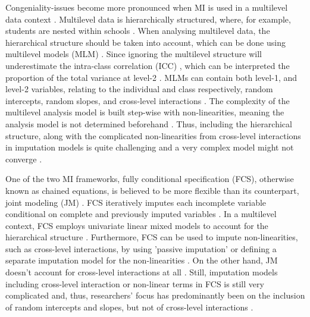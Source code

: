 \documentclass[10pt, a4paper, titlepage]{article}
\begin{document}
Congeniality-issues become more pronounced when MI is used in a multilevel data context \citep{mistlerComparisonJointModel2017, enders2018, enders2018a, enders2020, buurenFlexibleImputationMissing2018, taljaard2008, enders2016, resche-rigon2018, audigier2018, dong2023, grund2016, grund2018a, grund2018, ludtke2017, grund2021, quartagno2022}. Multilevel data is hierarchically structured, where, for example, students are nested within schools \citep{hox2017, hox2011}. When analysing multilevel data, the hierarchical structure should be taken into account, which can be done using multilevel models (MLM) \citep{hox2017, hox2011, ludtke2017}. Since ignoring the multilevel structure will underestimate the intra-class correlation (ICC) \citep{buurenFlexibleImputationMissing2018, ludtke2017, taljaard2008, hox2011}, which can be interpreted the proportion of the total variance at level-2 \citep{gulliford2005, shieh2012, hox2011}. MLMs can contain both level-1, and level-2 variables, relating to the individual and class respectively, random intercepts, random slopes, and cross-level interactions \citep{hox2017, hox2011}. The complexity of the multilevel analysis model is built step-wise with non-linearities, meaning the analysis model is not determined beforehand \citep{hox2017, hox2011}. Thus, including the hierarchical structure, along with the complicated non-linearities from cross-level interactions in imputation models is quite challenging  \citep{buurenFlexibleImputationMissing2018, burgette2010, hox2011} and a very complex model might not converge \citep{buurenFlexibleImputationMissing2018}.

One of the two MI frameworks, fully conditional specification (FCS), otherwise known as chained equations, is believed to be more flexible than its counterpart, joint modeling (JM) \citep{audigier2018, burgette2010, vanbuuren2007, grund2018a}. FCS iteratively imputes each incomplete variable conditional on complete and previously imputed variables \citep{mistlerComparisonJointModel2017, buurenFlexibleImputationMissing2018, enders2016, enders2018, enders2018a, hughes2014, grund2018a}. In a multilevel context, FCS employs univariate linear mixed models to account for the hierarchical structure \citep{mistlerComparisonJointModel2017, enders2018, resche-rigon2018}. Furthermore, FCS can be used to impute non-linearities, such as cross-level interactions, by using 'passive imputation' or defining a separate imputation model for the non-linearities \citep{buurenFlexibleImputationMissing2018, grund2018}. On the other hand, JM doesn't account for cross-level interactions at all \citep{buurenFlexibleImputationMissing2018, grund2018}. Still, imputation models including cross-level interaction or non-linear terms in FCS is still very complicated \citep{grund2021, grund2018} and, thus, researchers' focus has predominantly been on the inclusion of random intercepts and slopes, but not of cross-level interactions \citep{grund2018a, grund2016, enders2018, enders2018a, enders2020, enders2016}.
\end{document}
